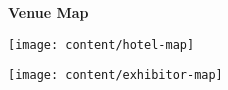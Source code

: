 \thispagestyle{empty}

\begin{center}
  {\huge\bf Venue Map}\label{maps}

  \texttt{[image: content/hotel-map]}
\end{center}

\clearpage
\begin{center}
  \texttt{[image: content/exhibitor-map]}
\end{center}